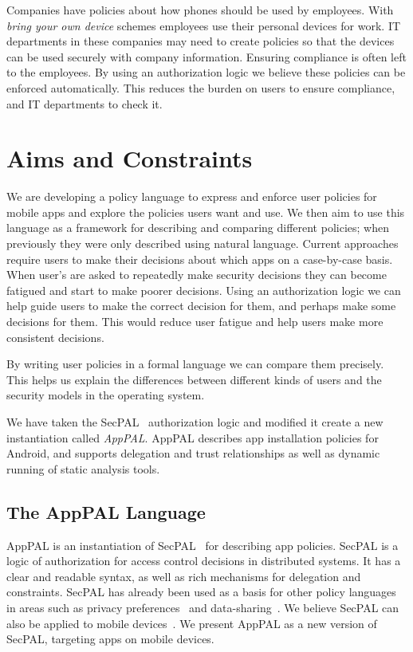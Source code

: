 \documentclass{scrartcl}
\begin{document}
Companies have policies about how phones should be used by employees.
With \emph{bring your own device} schemes employees use their personal devices for work.
IT departments in these companies may need to create policies so that the devices can be used securely with company information.
Ensuring compliance is often left to the employees.
By using an authorization logic we believe these policies can be enforced automatically.
This reduces the burden on users to ensure compliance, and IT departments to check it.


\section{Aims and Constraints}

We are developing a policy language to express and enforce user policies for mobile apps and explore the policies users want and use.
We then aim to use this language as a framework for describing and comparing different policies; when previously they were only described using natural language.
Current approaches require users to make their decisions about which apps on a case-by-case basis.
When user's are asked to repeatedly make security decisions they can become fatigued and start to make poorer decisions.
Using an authorization logic we can help guide users to make the correct decision for them, and perhaps make some decisions for them.
This would reduce user fatigue and help users make more consistent decisions.

By writing user policies in a formal language we can compare them precisely.
This helps us explain the differences between different kinds of users and the security models in the operating system.

We have taken the SecPAL~\citep{Becker:2006vh} authorization logic and modified it create a new instantiation called \emph{AppPAL}.
AppPAL describes app installation policies for Android, and supports delegation and trust relationships as well as dynamic running of static analysis tools.

\subsection{The AppPAL Language}

AppPAL is an instantiation of SecPAL~\citep{Becker:2006vh} for describing app policies.
SecPAL is a logic of authorization for access control decisions in distributed systems.
It has a clear and readable syntax, as well as rich mechanisms for delegation and constraints.
SecPAL has already been used as a basis for other policy languages in areas such as privacy preferences~\citep{Becker:2009ula} and data-sharing~\citep{Aziz:2011vt}.
We believe SecPAL can also be applied to mobile devices~\citep{Hallett:2014un}.
We present AppPAL as a new version of SecPAL, targeting apps on mobile devices.
\end{document}
